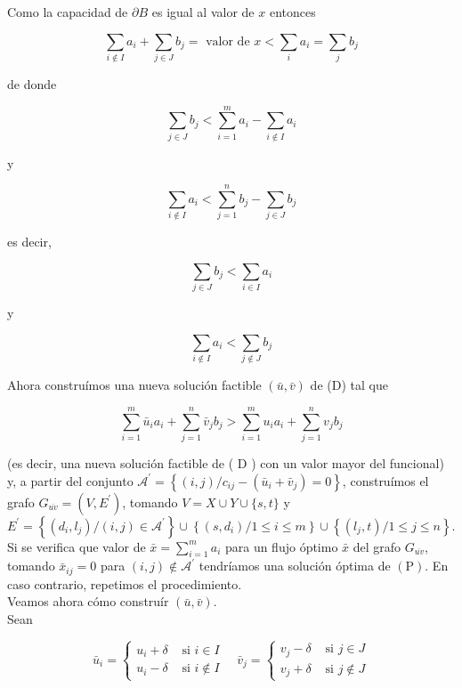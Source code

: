 \documentclass[10pt]{article}
\begin{document}
Como la capacidad de $\partial B$ es igual al valor de $x$ entonces

$$
\sum_{i \notin I} a_{i}+\sum_{j \in J} b_{j}=\text { valor de } x<\sum_{i} a_{i}=\sum_{j} b_{j}
$$

de donde

$$
\sum_{j \in J} b_{j}<\sum_{i=1}^{m} a_{i}-\sum_{i \notin I} a_{i}
$$

y

$$
\sum_{i \notin I} a_{i}<\sum_{j=1}^{n} b_{j}-\sum_{j \in J} b_{j}
$$

es decir,

$$
\sum_{j \in J} b_{j}<\sum_{i \in I} a_{i}
$$

y

$$
\sum_{i \notin I} a_{i}<\sum_{j \notin J} b_{j}
$$

Ahora construímos una nueva solución factible $(\bar{u}, \bar{v})$ de (D) tal que

$$
\sum_{i=1}^{m} \bar{u}_{i} a_{i}+\sum_{j=1}^{n} \bar{v}_{j} b_{j}>\sum_{i=1}^{m} u_{i} a_{i}+\sum_{j=1}^{n} v_{j} b_{j}
$$

(es decir, una nueva solución factible de ( D ) con un valor mayor del funcional) y, a partir del conjunto $\mathcal{A}^{\prime}=\left\{(i, j) / c_{i j}-\left(\bar{u}_{i}+\bar{v}_{j}\right)=0\right\}$, construímos el grafo $G_{\overline{u v}}=\left(V, E^{\prime}\right)$, tomando $V=X \cup Y \cup\{s, t\}$ y $E^{\prime}=\left\{\left(d_{i}, l_{j}\right) /(i, j) \in \mathcal{\mathcal { A } ^ { \prime }}\right\} \cup\left\{\left(s, d_{i}\right) / 1 \leq i \leq m\right\} \cup\left\{\left(l_{j}, t\right) / 1 \leq j \leq n\right\}$.\\
Si se verifica que valor de $\bar{x}=\sum_{i=1}^{m} a_{i}$ para un flujo óptimo $\bar{x}$ del grafo $G_{\overline{u v}}$, tomando $\bar{x}_{i j}=0$ para $(i, j) \notin \mathcal{A}^{\prime}$ tendríamos una solución óptima de $(\mathrm{P})$. En caso contrario, repetimos el procedimiento.\\
Veamos ahora cómo construír $(\bar{u}, \bar{v})$.\\
Sean

$$
\bar{u}_{i}=\left\{\begin{array}{ll}
u_{i}+\delta & \text { si } i \in I \\
u_{i}-\delta & \text { si } i \notin I
\end{array} \quad \bar{v}_{j}= \begin{cases}v_{j}-\delta & \text { si } j \in J \\
v_{j}+\delta & \text { si } j \notin J\end{cases}\right.
$$
\end{document}
